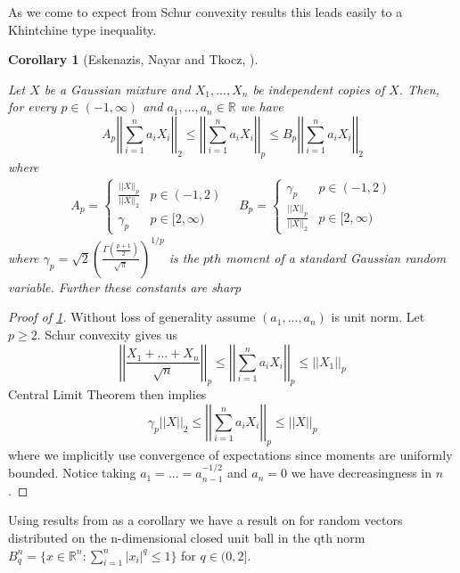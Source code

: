 \documentclass[10pt]{article}
\newcommand{\1}{\textbf{1}}
\newcommand{\R}{\mathbb{R}}
\newcommand{\norm}[1]{\left\lvert\left\lvert#1\right\rvert\right\rvert}
\newcommand{\normOne}[1]{\left\lvert#1\right\rvert}
\newtheorem{corollary}[theorem]{Corollary}
\theoremstyle{remark}
\theoremstyle{definition}
\begin{document}
As we come to expect from Schur convexity results this leads easily to a Khintchine type inequality.

\begin{corollary}[Eskenazis, Nayar and Tkocz, \cite{ENT}]\label{cor:ENT23}

	Let $X$ be a Gaussian mixture and $X_1,...,X_n$ be independent copies of $X$. Then, for every $p \in (-1,\infty)$ and $a_1,...,a_n \in \R$ we have
	\begin{equation}
		A_p \left|\left| \sum_{i=1}^n a_iX_i \right|\right|_2 \leq \left| \left|\sum_{i=1}^n a_i X_i\right| \right|_p \leq B_p \left| \left| \sum_{i=1}^n a_i X_i\right|\right|_2
	\end{equation}
	where
	\begin{align}
		A_p =
		\begin{cases}
			\frac{\norm{X}_p}{\left|\left| X\right|\right|_2} & p \in (-1,2)\\
			\gamma_p & p \in [2,\infty)
		\end{cases}
		\quad
		B_p =
		\begin{cases}
			\gamma_p & p \in (-1,2)\\
			\frac{\norm{X}_p}{\norm{X}_2} & p \in [2,\infty)
		\end{cases}
	\end{align}	
	where $\gamma_p = \sqrt{2}(\frac{\Gamma(\frac{p+1}{2})}{\sqrt{\pi}})^{1/p}$ is the $pth$ moment of a standard Gaussian random variable. Further these constants are sharp
\end{corollary}

\begin{proof}[Proof of \ref{cor:ENT23}]
	Without loss of generality assume $(a_1,...,a_n)$ is unit norm. Let $p \geq 2$. Schur convexity gives us
	\begin{equation}
		\norm{\frac{X_1+...+X_n}{\sqrt{n}}}_p \leq \norm{\sum_{i=1}^na_i X_i}_p \leq \norm{X_1}_p
	\end{equation}
	Central Limit Theorem then implies
	\begin{equation*}
		\gamma_p \norm{X}_2 \leq \norm{\sum_{i=1}^n a_iX_i}_p \leq \norm{X}_p
	\end{equation*}
	where we implicitly use convergence of expectations since moments are uniformly bounded. Notice taking $a_1=...=a_{n-1}^{-1/2}$ and $a_n = 0$ we have decreasingness in $n$. 
\end{proof}
	
Using results from \cite{BGMN} as a corollary we have a result on for random vectors distributed on the n-dimensional closed unit ball in the qth norm $B_q^n = \{x \in \R^n : \sum_{i=1}^n\normOne{x_i}^q \leq 1\}$ for $q \in (0,2]$.
\end{document}
